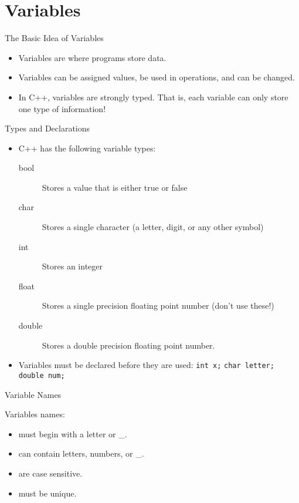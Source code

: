 \documentclass{beamer}
\begin{document}
\section{Variables}
\begin{frame}{The Basic Idea of Variables}
    \begin{itemize}[<+->]
        \item Variables are where programs store data.
        \item Variables can be assigned values, be used in operations,
            and can be changed.
        \item In C++, variables are strongly typed.  That is, each
            variable can only store one type of information!
    \end{itemize}
\end{frame}

\begin{frame}{Types and Declarations}
    \begin{itemize}[<+->]
        \item C++ has the following variable types:
            \begin{description}
                \item[bool] Stores a value that is either true or
                    false
                \item[char] Stores a single character (a letter,
                    digit, or any other symbol)
                \item[int] Stores an integer
                \item[float] Stores a single precision floating point
                    number (don't use these!)
                \item[double] Stores a double precision floating point 
                    number.
            \end{description}
        \item Variables must be declared before they are used:
            \newline\texttt{int x;}
            \newline\texttt{char letter;}
            \newline\texttt{double num;}
    \end{itemize}
\end{frame}

\begin{frame}{Variable Names}

Variables names:
\begin{itemize}[<+->]
    \item must begin with a letter or \_.
    \item can contain letters, numbers, or \_.
    \item are case sensitive.
    \item must be unique.
\end{itemize}
\end{frame}
\end{document}
